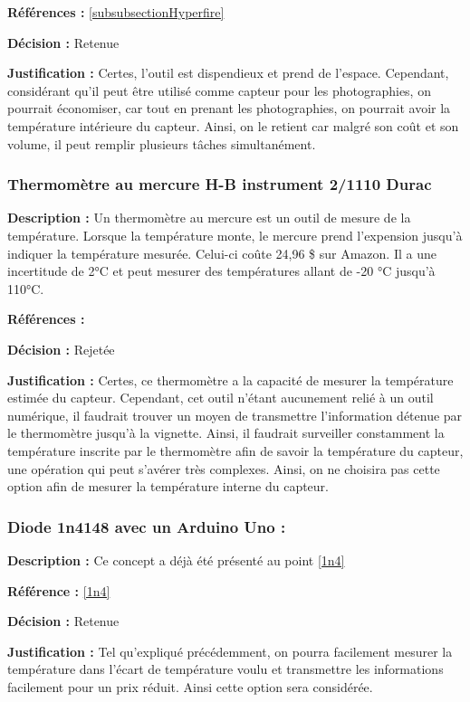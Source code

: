 \textbf{Références :} \ref{subsubsectionHyperfire}

\textbf{Décision :} Retenue

\textbf{Justification :} Certes, l'outil est dispendieux et prend de l'espace. Cependant, considérant qu'il peut être utilisé comme capteur pour les photographies, on pourrait économiser, car tout en prenant les photographies, on pourrait avoir la température intérieure du capteur. Ainsi, on le retient car malgré son coût et son volume, il peut remplir plusieurs tâches simultanément.

\subsubsection{Thermomètre au mercure H-B instrument 2/1110 Durac}
\textbf{Description :} Un thermomètre au mercure est un outil de mesure de la température. Lorsque la température monte, le mercure prend l'expension jusqu'à indiquer la température mesurée. Celui-ci coûte 24,96 \$ sur Amazon. Il a une incertitude de 2°C et peut mesurer des températures allant de -20 °C jusqu'à 110°C.

\textbf{Références :} \cite{mercure}

\textbf{Décision :} Rejetée

\textbf{Justification :} Certes, ce thermomètre a la capacité de mesurer la température estimée du capteur. Cependant, cet outil n'étant aucunement relié à un outil numérique, il faudrait trouver un moyen de transmettre l'information détenue par le thermomètre jusqu'à la vignette. Ainsi, il faudrait surveiller constamment la température inscrite par le thermomètre afin de savoir la température du capteur, une opération qui peut s'avérer très complexes. Ainsi, on ne choisira pas cette option afin de mesurer la température interne du capteur.

\subsubsection{Diode 1n4148 avec un Arduino Uno :}
\textbf{Description :} Ce concept a déjà été présenté au point \ref{1n4}

\textbf{Référence :} \ref{1n4}

\textbf{Décision :} Retenue

\textbf{Justification :} Tel qu'expliqué précédemment, on pourra facilement mesurer la température dans l'écart de température voulu et transmettre les informations facilement pour un prix réduit. Ainsi cette option sera considérée. 

